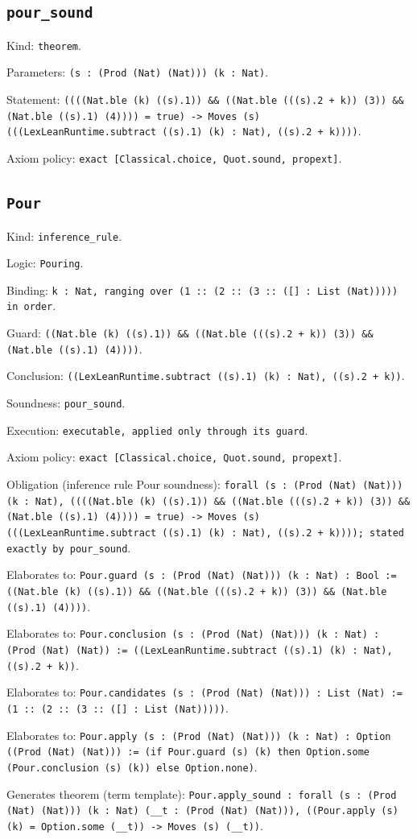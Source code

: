\documentclass[11pt]{article}
\begin{document}
\subsection*{\texttt{pour\_sound}}
\noindent Kind: \texttt{theorem}.\par
\noindent Parameters: \texttt{(s : (Prod (Nat) (Nat))) (k : Nat)}.\par
\noindent Statement: \texttt{((((Nat.ble (k) ((s).1)) \&\& ((Nat.ble (((s).2 + k)) (3)) \&\& (Nat.ble ((s).1) (4)))) = true) -> Moves (s) (((LexLeanRuntime.subtract ((s).1) (k) : Nat), ((s).2 + k))))}.\par
\noindent Axiom policy: \texttt{exact [Classical.choice, Quot.sound, propext]}.\par
\subsection*{\texttt{Pour}}
\noindent Kind: \texttt{inference_rule}.\par
\noindent Logic: \texttt{Pouring}.\par
\noindent Binding: \texttt{k : Nat, ranging over (1 :: (2 :: (3 :: ([] : List (Nat))))) in order}.\par
\noindent Guard: \texttt{((Nat.ble (k) ((s).1)) \&\& ((Nat.ble (((s).2 + k)) (3)) \&\& (Nat.ble ((s).1) (4))))}.\par
\noindent Conclusion: \texttt{((LexLeanRuntime.subtract ((s).1) (k) : Nat), ((s).2 + k))}.\par
\noindent Soundness: \texttt{pour\_sound}.\par
\noindent Execution: \texttt{executable, applied only through its guard}.\par
\noindent Axiom policy: \texttt{exact [Classical.choice, Quot.sound, propext]}.\par
\noindent Obligation (inference rule Pour soundness): \texttt{forall (s : (Prod (Nat) (Nat))) (k : Nat), ((((Nat.ble (k) ((s).1)) \&\& ((Nat.ble (((s).2 + k)) (3)) \&\& (Nat.ble ((s).1) (4)))) = true) -> Moves (s) (((LexLeanRuntime.subtract ((s).1) (k) : Nat), ((s).2 + k)))); stated exactly by pour\_sound}.\par
\noindent Elaborates to: \texttt{Pour.guard (s : (Prod (Nat) (Nat))) (k : Nat) : Bool := ((Nat.ble (k) ((s).1)) \&\& ((Nat.ble (((s).2 + k)) (3)) \&\& (Nat.ble ((s).1) (4))))}.\par
\noindent Elaborates to: \texttt{Pour.conclusion (s : (Prod (Nat) (Nat))) (k : Nat) : (Prod (Nat) (Nat)) := ((LexLeanRuntime.subtract ((s).1) (k) : Nat), ((s).2 + k))}.\par
\noindent Elaborates to: \texttt{Pour.candidates (s : (Prod (Nat) (Nat))) : List (Nat) := (1 :: (2 :: (3 :: ([] : List (Nat)))))}.\par
\noindent Elaborates to: \texttt{Pour.apply (s : (Prod (Nat) (Nat))) (k : Nat) : Option ((Prod (Nat) (Nat))) := (if Pour.guard (s) (k) then Option.some (Pour.conclusion (s) (k)) else Option.none)}.\par
\noindent Generates theorem (term template): \texttt{Pour.apply\_sound : forall (s : (Prod (Nat) (Nat))) (k : Nat) (\_\_t : (Prod (Nat) (Nat))), ((Pour.apply (s) (k) = Option.some (\_\_t)) -> Moves (s) (\_\_t))}.\par
\end{document}
